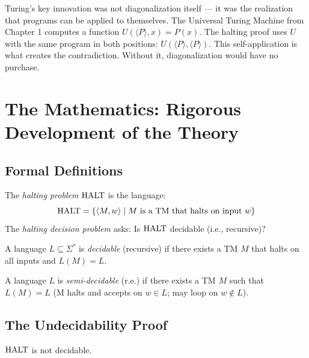Turing's key innovation was not diagonalization itself — it was the realization that programs can be applied to themselves. The Universal Turing Machine from Chapter 1 computes a function $U(\langle P \rangle, x) = P(x)$. The halting proof uses $U$ with the same program in both positions: $U(\langle P \rangle, \langle P \rangle)$. This self-application is what creates the contradiction. Without it, diagonalization would have no purchase.

\section{The Mathematics: Rigorous Development of the Theory}
\label{sec:halting:math}

\subsection{Formal Definitions}
\label{sec:halting:definitions}

\begin{definition}
The \emph{halting problem} $\text{HALT}$ is the language:
\[
\text{HALT} = \{ \langle M, w \rangle \mid M \text{ is a TM that halts on input } w \}
\]
The \emph{halting decision problem} asks: Is $\text{HALT}$ decidable (i.e., recursive)?
\end{definition}

\begin{definition}
A language $L \subseteq \Sigma^*$ is \emph{decidable} (recursive) if there exists a TM $M$ that halts on all inputs and $L(M) = L$.
\end{definition}

\begin{definition}
A language $L$ is \emph{semi-decidable} (r.e.) if there exists a TM $M$ such that $L(M) = L$ (M halts and accepts on $w \in L$; may loop on $w \notin L$).
\end{definition}

\subsection{The Undecidability Proof}
\label{sec:halting:proof}

\begin{theorem}
$\text{HALT}$ is not decidable.
\end{theorem}

